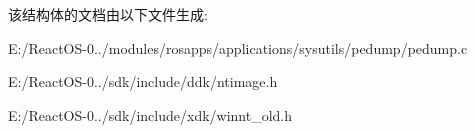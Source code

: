 该结构体的文档由以下文件生成\+:\begin{DoxyCompactItemize}
\item 
E\+:/\+React\+O\+S-\/0../modules/rosapps/applications/sysutils/pedump/pedump.\+c\item 
E\+:/\+React\+O\+S-\/0../sdk/include/ddk/ntimage.\+h\item 
E\+:/\+React\+O\+S-\/0../sdk/include/xdk/winnt\+\_\+old.\+h\end{DoxyCompactItemize}
